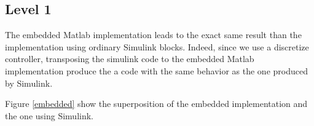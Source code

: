 \subsection*{Level 1}

The embedded Matlab implementation leads to the exact same result than the implementation using ordinary Simulink blocks. Indeed, since we use a discretize controller, transposing the simulink code to the embedded Matlab implementation produce the a code with the same behavior as the one produced by Simulink.

Figure \ref{embedded} show the superposition of the embedded implementation and the one using Simulink.


